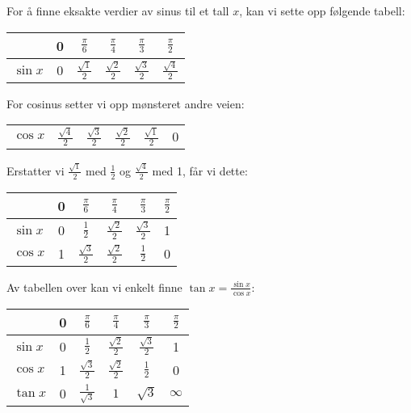 



\begin{comment}
	\chapter*{Vedlegg A-H \label{Tips} \addcontentsline{toc}{chapter}{Vedlegg A-H}}
	\vspace{20 pt}
\end{comment}	
For å finne eksakte verdier av sinus til et tall $ x $, kan vi sette opp følgende tabell:\vs \renewcommand{\arraystretch}{1.5}	
\begin{center}
	\begin{tabular}{l|c|c|c|c|c|}
		& 0&$\frac{\pi}{6}$ & $\frac{\pi}{4}$ &$\frac{\pi}{3}$ & $\frac{\pi}{2}$    \\
		\hline
		$\sin x$ & 0 &$\frac{\sqrt{1}}{2}$ & $\frac{\sqrt{2}}{2}$ & $\frac{\sqrt{3}}{2}$ & $ \frac{\sqrt{4}}{2} $ \\
	\end{tabular}
\end{center}
For cosinus setter vi opp mønsteret andre veien:
\begin{center}
	\begin{tabular}{l|c|c|c|c|c}
		$\cos x$ & $\frac{\sqrt{4}}{2}  $ & $\frac{\sqrt{3}}{2}$ & $\frac{\sqrt{2}}{2}$ & $\frac{\sqrt{1}}{2}$ & 0 \\
	\end{tabular}
\end{center}
Erstatter vi $ {\frac{\sqrt{1}}{2}} $ med $ \frac{1}{2} $ og $ \frac{\sqrt{4}}{2} $ med 1, får vi dette:

\begin{center}
	\renewcommand{\arraystretch}{1.5}	
	\begin{tabular}{l|c|c|c|c|c}
		& 0&$\frac{\pi}{6}$ & $\frac{\pi}{4}$ &$\frac{\pi}{3}$ & $\frac{\pi}{2}$    \\
		\hline
		$\sin x$ & 0 &$\frac{1}{2}$ & $\frac{\sqrt{2}}{2}$ & $\frac{\sqrt{3}}{2}$ & 1 \\
		$\cos x$ & 1 & $\frac{\sqrt{3}}{2}$ & $\frac{\sqrt{2}}{2}$ & $\frac{1}{2}$ & 0 \\
	\end{tabular}
\end{center}
Av tabellen over kan vi enkelt finne $\tan x= \frac{\sin x}{\cos x} $:
\begin{center}
	\renewcommand{\arraystretch}{1.5}	
	\begin{tabular}{l|c|c|c|c|c}
		& 0&$\frac{\pi}{6}$ & $\frac{\pi}{4}$ &$\frac{\pi}{3}$ & $\frac{\pi}{2}$    \\
		\hline
		$\sin x$ & 0 &$\frac{1}{2}$ & $\frac{\sqrt{2}}{2}$ & $\frac{\sqrt{3}}{2}$ & 1 \\
		$\cos x$ & 1 & $\frac{\sqrt{3}}{2}$ & $\frac{\sqrt{2}}{2}$ & $\frac{1}{2}$ & 0 \\
		$\tan x$ & 0 &$\frac{1}{\sqrt{3}}$ & $1$ & $\sqrt{3}$ & $ \infty  $
	\end{tabular}
\end{center}

